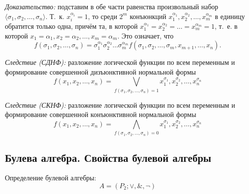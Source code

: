 \documentclass[a4paper,12pt]{report}
\begin{document}
	\textit{Доказательство:} подставим в обе части равенства произвольный набор
	$ \langle \sigma_1, \sigma_2, \dots, \sigma_n \rangle $. Т.~к.
	$ x^{\alpha_i}_i = 1 $, то среди $ 2^m $ конъюнкций $ x^{\alpha_1}_1,
	x^{\alpha_2}_2, \dots, x^{\alpha_m}_m $ в единицу обратится только одна,
	причём та, в которой $ x^{\alpha_1}_1 = x^{\alpha_2}_2 = \dots =
	x^{\alpha_m}_m = 1 $, т.~е. в которой $ x_1 = \alpha_1, x_2 = \alpha_2,
	\dots, x_m = \alpha_m $. Это означает, что
	$$f(\sigma_1, \sigma_2, \dots, \sigma_n) =
	\sigma_1^{\alpha_1} \sigma_2^{\alpha_2} \dots \sigma_m^{\alpha_m}
	f(\sigma_1, \sigma_2, \dots, \sigma_m, x_{m+1}, \dots, x_n).$$

	\textit{Следствие (СДНФ):} разложение
	логической функции по всем переменным и формирование совершенной
	дизъюнктивной нормальной формы
	$$f(x_1, x_2, \dots, x_n) = \bigvee_{f(\sigma_1, \sigma_2, \dots, \sigma_n)
	= 1} x^{\sigma_1}_1, x^{\sigma_2}_2, \dots, x^{\sigma_n}_n$$

	\textit{Следствие (СКНФ):} разложение
	логической функции по всем переменным и формирование совершенной
	конъюнктивной нормальной формы
	$$f(x_1, x_2, \dots, x_n) = \bigwedge_{f(\sigma_1, \sigma_2, \dots, \sigma_n)
	= 0} x^{\sigma_1}_1, x^{\sigma_2}_2, \dots, x^{\sigma_n}_n$$


\subsection{Булева алгебра. Свойства булевой алгебры}

	Определение булевой алгебры:
	$$A = (P_2; \vee, \&, \neg)$$
\end{document}
